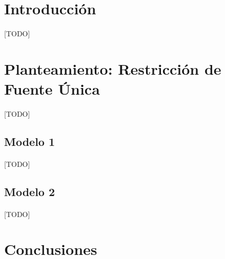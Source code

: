 \documentclass[a4paper, spanish]{article}
\begin{document}
  \maketitle

  \begin{abstract}
    \noindent [TODO]
  \end{abstract}


  \section{Introducción}
  \label{sec:introduction}

    \paragraph{}
    [TODO]

  \section{Planteamiento: Restricción de Fuente Única}
  \label{sec:approach}

    \paragraph{}
    [TODO]

    \subsection{Modelo 1}
    \label{sec:approach-1}

      \paragraph{}
      [TODO]

    \subsection{Modelo 2}
    \label{sec:approach-2}

      \paragraph{}
      [TODO]

  \section{Conclusiones}
  \label{sec:conclusions}
\end{document}
